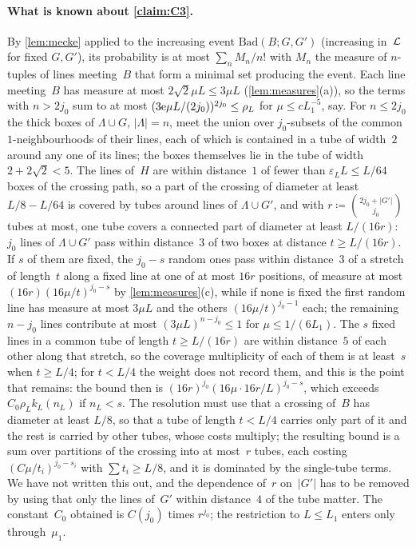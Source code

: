 \documentclass[11pt,letterpaper]{article}
\newcommand{\Bad}{\mathrm{Bad}}
\begin{document}
\paragraph{What is known about \cref{claim:C3}.} By \cref{lem:mecke} applied to the increasing event $\Bad(B;G,G')$ (increasing in~$\mathcal L$ for fixed $G,G'$), its probability is at most $\sum_nM_n/n!$ with $M_n$ the measure of $n$-tuples of lines meeting~$B$ that form a minimal set producing the event. Each line meeting~$B$ has measure at most $2\sqrt2\mu L\le3\mu L$ (\cref{lem:measures}(a)), so the terms with $n>2j_0$ sum to at most $(3\mathrm{e}\mu L/(2j_0))^{2j_0}\le\rho_L$ for $\mu\le cL_1^{-5}$, say. For $n\le2j_0$ the thick boxes of $\Lambda\cup G$, $\lvert\Lambda\rvert=n$, meet the union over $j_0$-subsets of the common $1$-neighbourhoods of their lines, each of which is contained in a tube of width~$2$ around any one of its lines; the boxes themselves lie in the tube of width $2+2\sqrt2<5$. The lines of~$H$ are within distance~$1$ of fewer than $\varepsilon_LL\le L/64$ boxes of the crossing path, so a part of the crossing of diameter at least $L/8-L/64$ is covered by tubes around lines of $\Lambda\cup G'$, and with $r\coloneqq\binom{2j_0+\lvert G'\rvert}{j_0}$ tubes at most, one tube covers a connected part of diameter at least $L/(16r)$: $j_0$ lines of $\Lambda\cup G'$ pass within distance~$3$ of two boxes at distance $t\ge L/(16r)$. If $s$ of them are fixed, the $j_0-s$ random ones pass within distance~$3$ of a stretch of length~$t$ along a fixed line at one of at most $16r$ positions, of measure at most $(16r)(16\mu/t)^{j_0-s}$ by \cref{lem:measures}(c), while if none is fixed the first random line has measure at most $3\mu L$ and the others $(16\mu/t)^{j_0-1}$ each; the remaining $n-j_0$ lines contribute at most $(3\mu L)^{n-j_0}\le1$ for $\mu\le1/(6L_1)$. The $s$ fixed lines in a common tube of length $t\ge L/(16r)$ are within distance~$5$ of each other along that stretch, so the coverage multiplicity of each of them is at least~$s$ when $t\ge L/4$; for $t<L/4$ the weight does not record them, and this is the point that remains: the bound then is $(16r)^{j_0}(16\mu\cdot16r/L)^{j_0-s}$, which exceeds $C_0\rho_Lk_L(n_L)$ if $n_L<s$. The resolution must use that a crossing of~$B$ has diameter at least $L/8$, so that a tube of length $t<L/4$ carries only part of it and the rest is carried by other tubes, whose costs multiply; the resulting bound is a sum over partitions of the crossing into at most~$r$ tubes, each costing $(C\mu/t_i)^{j_0-s_i}$ with $\sum t_i\ge L/8$, and it is dominated by the single-tube terms. We have not written this out, and the dependence of~$r$ on~$\lvert G'\rvert$ has to be removed by using that only the lines of~$G'$ within distance~$4$ of the tube matter. The constant~$C_0$ obtained is $C(j_0)$ times $r^{j_0}$; the restriction to $L\le L_1$ enters only through~$\mu_1$.
\end{document}
